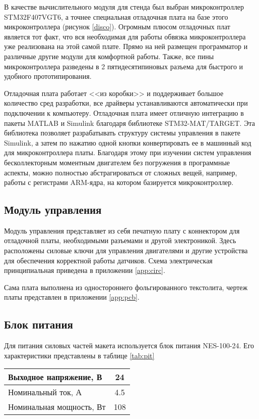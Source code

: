 В качестве вычислительного модуля для стенда был выбран микроконтроллер STM32F407VGT6, 
а точнее специальная
отладочная плата на базе этого микроконтроллера (рисунок \ref{disco}). Огромным плюсом 
отладочных плат является тот факт, что
вся необходимая для работы обвязка микроконтроллера уже реализована на этой самой плате.
Прямо на ней размещен программатор и различные другие модули для комфортной работы.
Также, все пины микроконтроллера разведены в 2 пятидесятипиновых разъема для быстрого и удобного 
прототипирования.


Отладочная плата работает <<из коробки>> и поддерживает большое количество сред разработки,
все драйверы устанавливаются автоматически при подключении к компьютеру. Отладочная
плата имеет отличную интеграцию в пакеты MATLAB и Simulink благодаря библиотеке STM32-MAT/TARGET.
Эта библиотека позволяет разрабатывать структуру системы управления в пакете Simulink, а затем 
по нажатию одной кнопки конвертировать ее в машинный код для микроконтроллера платы.
Благодаря этому при изучении систем управления бесколлекторным моментным двигателем без
погружения в программные аспекты,
можно полностью абстрагироваться от сложных вещей, например, работы с регистрами ARM-ядра,
на котором базируется микроконтроллер.

\subsection{Модуль управления}

Модуль управления представляет из себя печатную плату с коннектором для отладочной платы, необходимыми 
разъемами и другой электроникой. Здесь расположены силовые ключи для управления 
двигателями и другие устройства для обеспечения корректной работы датчиков.
Схема электрическая принципиальная приведена в приложении \ref{app:circ}.

Сама плата выполнена из одностороннего фольгированного текстолита, чертеж платы представлен
в приложении \ref{app:pcb}.

\subsection{Блок питания}

Для питания силовых частей макета используется блок питания NES-100-24. Его характеристики представлены в таблице \ref{tab:pit}

\begin{tabularx}{\textwidth}{|X|c|}
  \caption{Характеристики блока питания}\label{tab:pit}\\
  \hline
    Выходное напряжение, В & 24 \\
  \hline
    Номинальный ток, А & 4.5 \\
  \hline
    Номинальная мощность, Вт & 108 \\
  \hline
\end{tabularx}


